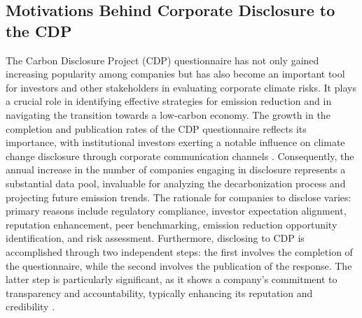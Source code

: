 \subsection{Motivations Behind Corporate Disclosure to the CDP}
The Carbon Disclosure Project (CDP) questionnaire has not only gained increasing popularity among companies but has also become an important tool for investors and other stakeholders in evaluating corporate climate risks. It plays a crucial role in identifying effective strategies for emission reduction and in navigating the transition towards a low-carbon economy. The growth in the completion and publication rates of the CDP questionnaire reflects its importance, with institutional investors exerting a notable influence on climate change disclosure through corporate communication channels \cite{Cotter2012Institutional}. Consequently, the annual increase in the number of companies engaging in disclosure represents a substantial data pool, invaluable for analyzing the decarbonization process and projecting future emission trends. The rationale for companies to disclose varies: primary reasons include regulatory compliance, investor expectation alignment, reputation enhancement, peer benchmarking, emission reduction opportunity identification, and risk assessment. Furthermore, disclosing to CDP is accomplished through two independent steps: the first involves the completion of the questionnaire, while the second involves the publication of the response. The latter step is particularly significant, as it shows a company’s commitment to transparency and accountability, typically enhancing its reputation and credibility \cite{Cotter2012Institutional}.

